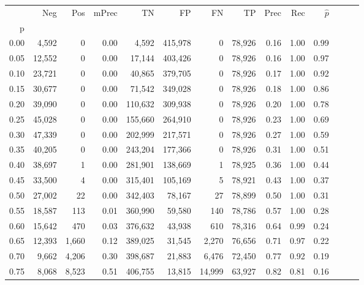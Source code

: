 \begin{tabular}{rrrrrrrrrrrrrr}
\toprule
{} &     Neg &     Pos & mPrec &       TN &       FP &      FN &      TP &  Prec &   Rec & $\hat{p}$ \\
p    &         &         &       &          &          &         &         &       &       &           \\
\midrule
0.00 &   4,592 &       0 &  0.00 &    4,592 &  415,978 &       0 &  78,926 &  0.16 &  1.00 &      0.99 \\
0.05 &  12,552 &       0 &  0.00 &   17,144 &  403,426 &       0 &  78,926 &  0.16 &  1.00 &      0.97 \\
0.10 &  23,721 &       0 &  0.00 &   40,865 &  379,705 &       0 &  78,926 &  0.17 &  1.00 &      0.92 \\
0.15 &  30,677 &       0 &  0.00 &   71,542 &  349,028 &       0 &  78,926 &  0.18 &  1.00 &      0.86 \\
0.20 &  39,090 &       0 &  0.00 &  110,632 &  309,938 &       0 &  78,926 &  0.20 &  1.00 &      0.78 \\
0.25 &  45,028 &       0 &  0.00 &  155,660 &  264,910 &       0 &  78,926 &  0.23 &  1.00 &      0.69 \\
0.30 &  47,339 &       0 &  0.00 &  202,999 &  217,571 &       0 &  78,926 &  0.27 &  1.00 &      0.59 \\
0.35 &  40,205 &       0 &  0.00 &  243,204 &  177,366 &       0 &  78,926 &  0.31 &  1.00 &      0.51 \\
0.40 &  38,697 &       1 &  0.00 &  281,901 &  138,669 &       1 &  78,925 &  0.36 &  1.00 &      0.44 \\
0.45 &  33,500 &       4 &  0.00 &  315,401 &  105,169 &       5 &  78,921 &  0.43 &  1.00 &      0.37 \\
0.50 &  27,002 &      22 &  0.00 &  342,403 &   78,167 &      27 &  78,899 &  0.50 &  1.00 &      0.31 \\
0.55 &  18,587 &     113 &  0.01 &  360,990 &   59,580 &     140 &  78,786 &  0.57 &  1.00 &      0.28 \\
0.60 &  15,642 &     470 &  0.03 &  376,632 &   43,938 &     610 &  78,316 &  0.64 &  0.99 &      0.24 \\
0.65 &  12,393 &   1,660 &  0.12 &  389,025 &   31,545 &   2,270 &  76,656 &  0.71 &  0.97 &      0.22 \\
0.70 &   9,662 &   4,206 &  0.30 &  398,687 &   21,883 &   6,476 &  72,450 &  0.77 &  0.92 &      0.19 \\
0.75 &   8,068 &   8,523 &  0.51 &  406,755 &   13,815 &  14,999 &  63,927 &  0.82 &  0.81 &      0.16 \\

\end{tabular}
